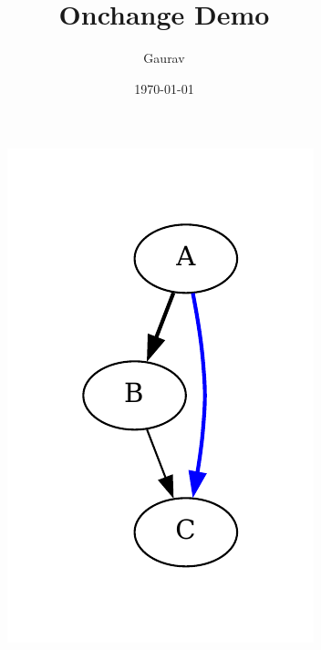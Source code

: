 \documentclass{article}
\date{\today}
\title{Onchange Demo}
\author{Gaurav}
\begin{document}
\begin{figure}[htbp]
\centering
\begin{subfigure}{0.45\textwidth}
\includegraphics[width=.9\linewidth]{./graph-1.pdf}
\end{subfigure}
\begin{subfigure}{0.45\textwidth}

\end{subfigure}
\end{figure}
\end{document}
